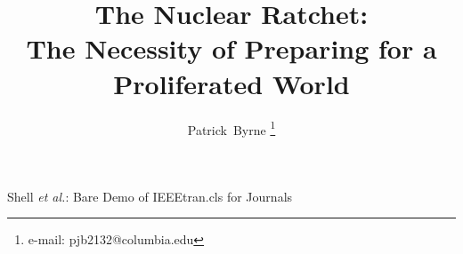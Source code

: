 \documentclass[journal]{IEEEtran}
\begin{document}
%
\title{The Nuclear Ratchet:\\
\Large{The Necessity of Preparing for a Proliferated World}}

%
%
%

\author{Patrick~Byrne%
\thanks{%
e-mail: pjb2132@columbia.edu}}%

% 
%



{Shell \MakeLowercase{\textit{et al.}}: Bare Demo of IEEEtran.cls for Journals}
% 
\end{document}
